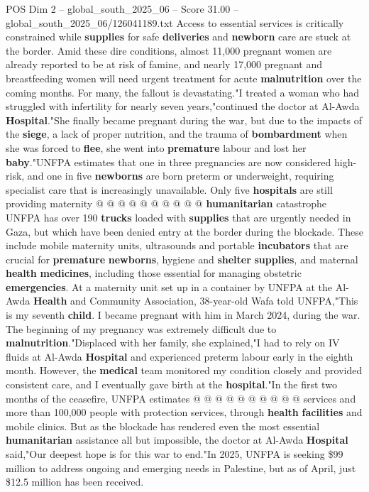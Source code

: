 \begin{textsample}{POS Dim 2 – global\_south\_2025\_06 – Score 31.00 – global\_south\_2025\_06/126041189.txt}
Access to essential services is critically constrained while \textbf{supplies} for safe \textbf{deliveries} and \textbf{newborn} care are stuck at the border.
Amid these dire conditions, almost 11,000 pregnant women are already reported to be at risk of famine, and nearly 17,000 pregnant and breastfeeding women will need urgent treatment for acute \textbf{malnutrition} over the coming months.
For many, the fallout is devastating."I treated a woman who had struggled with infertility for nearly seven years,"continued the doctor at Al-Awda \textbf{Hospital}."She finally became pregnant during the war, but due to the impacts of the \textbf{siege}, a lack of proper nutrition, and the trauma of \textbf{bombardment} when she was forced to \textbf{flee}, she went into \textbf{premature} labour and lost her \textbf{baby}."UNFPA estimates that one in three pregnancies are now considered high-risk, and one in five \textbf{newborns} are born preterm or underweight, requiring specialist care that is increasingly unavailable.
Only five \textbf{hospitals} are still providing maternity @ @ @ @ @ @ @ @ @ @ \textbf{humanitarian} catastrophe UNFPA has over 190 \textbf{trucks} loaded with \textbf{supplies} that are urgently needed in Gaza, but which have been denied entry at the border during the blockade.
These include mobile maternity units, ultrasounds and portable \textbf{incubators} that are crucial for \textbf{premature} \textbf{newborns}, hygiene and \textbf{shelter} \textbf{supplies}, and maternal \textbf{health} \textbf{medicines}, including those essential for managing obstetric \textbf{emergencies}.
At a maternity unit set up in a container by UNFPA at the Al-Awda \textbf{Health} and Community Association, 38-year-old Wafa told UNFPA,"This is my seventh \textbf{child}.
I became pregnant with him in March 2024, during the war.
The beginning of my pregnancy was extremely difficult due to \textbf{malnutrition}."Displaced with her family, she explained,"I had to rely on IV fluids at Al-Awda \textbf{Hospital} and experienced preterm labour early in the eighth month.
However, the \textbf{medical} team monitored my condition closely and provided consistent care, and I eventually gave birth at the \textbf{hospital}."In the first two months of the ceasefire, UNFPA estimates @ @ @ @ @ @ @ @ @ @ services and more than 100,000 people with protection services, through \textbf{health} \textbf{facilities} and mobile clinics.
But as the blockade has rendered even the most essential \textbf{humanitarian} assistance all but impossible, the doctor at Al-Awda \textbf{Hospital} said,"Our deepest hope is for this war to end."In 2025, UNFPA is seeking \$99 million to address ongoing and emerging needs in Palestine, but as of April, just \$12.5 million has been received.

\end{textsample}
